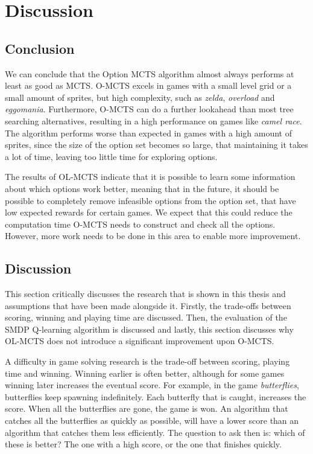 \chapter{Discussion}
\label{sec:conclusion}



\section{Conclusion}
We can conclude that the Option MCTS algorithm almost always performs at least
as good as MCTS. O-MCTS excels in games with a small level grid or a small
amount of sprites, but high complexity, such as \textit{zelda},
\textit{overload} and \textit{eggomania}.  Furthermore, O-MCTS can do a further
lookahead than most tree searching alternatives, resulting in a high performance
on games like \textit{camel race}. The algorithm performs worse than expected in
games with a high amount of sprites, since the size of the option set becomes so
large, that maintaining it takes a lot of time, leaving too little time for
exploring options. 

The results of OL-MCTS indicate that it is possible to learn some information
about which options work better, meaning that in the future, it should be
possible to completely remove infeasible options from the option set, that have
low expected rewards for certain games. We expect that this could reduce the
computation time O-MCTS needs to construct and check all the options. However,
more work needs to be done in this area to enable more improvement.

\section{Discussion}
This section critically discusses the research that is shown in this thesis and
assumptions that have been made alongside it. Firstly, the trade-offs between
scoring, winning and playing time are discussed. Then, the evaluation of the
SMDP Q-learning algorithm is discussed and lastly, this section discusses why
OL-MCTS does not introduce a significant improvement upon O-MCTS.

A difficulty in game solving research is the trade-off between scoring, playing
time and winning. Winning earlier is often better, although for some games
winning later increases the eventual score. For example, in the game
\textit{butterflies}, butterflies keep spawning indefinitely. Each butterfly
that is caught, increases the score.  When all the butterflies are gone, the
game is won. An algorithm that catches all the butterflies as quickly as
possible, will have a lower score than an algorithm that catches them less
efficiently. The question to ask then is: which of these is better? The one with
a high score, or the one that finishes quickly.

